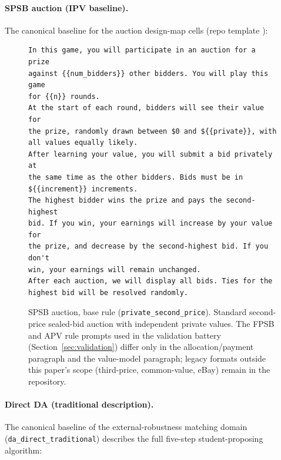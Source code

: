 \paragraph{SPSB auction (IPV baseline).} The canonical baseline for the auction design-map cells (repo template ):

\begin{figure}[H]
\begin{lstlisting}
In this game, you will participate in an auction for a prize
against {{num_bidders}} other bidders. You will play this game
for {{n}} rounds.
At the start of each round, bidders will see their value for
the prize, randomly drawn between $0 and ${{private}}, with
all values equally likely.
After learning your value, you will submit a bid privately at
the same time as the other bidders. Bids must be in
${{increment}} increments.
The highest bidder wins the prize and pays the second-highest
bid. If you win, your earnings will increase by your value for
the prize, and decrease by the second-highest bid. If you don't
win, your earnings will remain unchanged.
After each auction, we will display all bids. Ties for the
highest bid will be resolved randomly.
\end{lstlisting}
\caption{SPSB auction, base rule (\texttt{private\_second\_price}). Standard second-price sealed-bid auction with independent private values. The FPSB and APV rule prompts used in the validation battery (Section~\ref{sec:validation}) differ only in the allocation/payment paragraph and the value-model paragraph; legacy formats outside this paper's scope (third-price, common-value, eBay) remain in the repository.}
\label{fig:prompt-spsb-base}
\end{figure}

\paragraph{Direct DA (traditional description).} The canonical baseline of the external-robustness matching domain (\texttt{da\_direct\_traditional}) describes the full five-step student-proposing algorithm:

